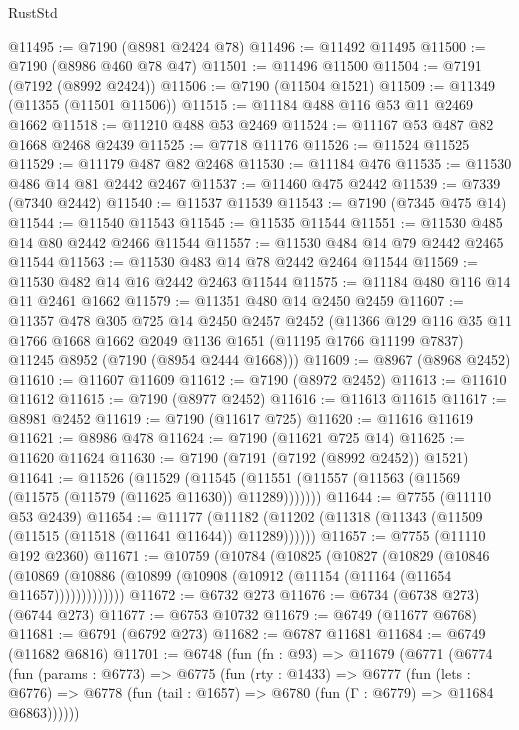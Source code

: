 \begin{lexlean}{RustStd}
\begin{coremodule}
@11495 := @7190 (@8981 @2424 @78)
@11496 := @11492 @11495
@11500 := @7190 (@8986 @460 @78 @47)
@11501 := @11496 @11500
@11504 := @7191 (@7192 (@8992 @2424))
@11506 := @7190 (@11504 @1521)
@11509 := @11349 (@11355 (@11501 @11506))
@11515 := @11184 @488 @116 @53 @11 @2469 @1662
@11518 := @11210 @488 @53 @2469
@11524 := @11167 @53 @487 @82 @1668 @2468 @2439
@11525 := @7718 @11176
@11526 := @11524 @11525
@11529 := @11179 @487 @82 @2468
@11530 := @11184 @476
@11535 := @11530 @486 @14 @81 @2442 @2467
@11537 := @11460 @475 @2442
@11539 := @7339 (@7340 @2442)
@11540 := @11537 @11539
@11543 := @7190 (@7345 @475 @14)
@11544 := @11540 @11543
@11545 := @11535 @11544
@11551 := @11530 @485 @14 @80 @2442 @2466 @11544
@11557 := @11530 @484 @14 @79 @2442 @2465 @11544
@11563 := @11530 @483 @14 @78 @2442 @2464 @11544
@11569 := @11530 @482 @14 @16 @2442 @2463 @11544
@11575 := @11184 @480 @116 @14 @11 @2461 @1662
@11579 := @11351 @480 @14 @2450 @2459
@11607 := @11357
    @478
    @305
    @725
    @14
    @2450
    @2457
    @2452
    (@11366
      @129
      @116
      @35
      @11
      @1766
      @1668
      @1662
      @2049
      @1136
      @1651
      (@11195 @1766 @11199 @7837)
      @11245
      @8952
      (@7190 (@8954 @2444 @1668)))
@11609 := @8967 (@8968 @2452)
@11610 := @11607 @11609
@11612 := @7190 (@8972 @2452)
@11613 := @11610 @11612
@11615 := @7190 (@8977 @2452)
@11616 := @11613 @11615
@11617 := @8981 @2452
@11619 := @7190 (@11617 @725)
@11620 := @11616 @11619
@11621 := @8986 @478
@11624 := @7190 (@11621 @725 @14)
@11625 := @11620 @11624
@11630 := @7190 (@7191 (@7192 (@8992 @2452)) @1521)
@11641 := @11526
    (@11529 (@11545 (@11551 (@11557 (@11563 (@11569 (@11575 (@11579 (@11625 @11630)) @11289)))))))
@11644 := @7755 (@11110 @53 @2439)
@11654 := @11177
    (@11182 (@11202 (@11318 (@11343 (@11509 (@11515 (@11518 (@11641 @11644)) @11289))))))
@11657 := @7755 (@11110 @192 @2360)
@11671 := @10759
    (@10784
      (@10825
        (@10827
          (@10829
            (@10846
              (@10869 (@10886 (@10899 (@10908 (@10912 (@11154 (@11164 (@11654 @11657)))))))))))))
@11672 := @6732 @273
@11676 := @6734 (@6738 @273) (@6744 @273)
@11677 := @6753 @10732
@11679 := @6749 (@11677 @6768)
@11681 := @6791 (@6792 @273)
@11682 := @6787 @11681
@11684 := @6749 (@11682 @6816)
@11701 := @6748
    (fun (fn : @93) =>
    @11679
      (@6771
        (@6774
          (fun (params : @6773) =>
          @6775
            (fun (rty : @1433) =>
            @6777
              (fun (lets : @6776) =>
              @6778 (fun (tail : @1657) => @6780 (fun (Γ : @6779) => @11684 @6863))))))

\end{coremodule}
\end{lexlean}

